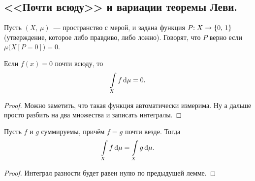 \documentclass{notes}
\begin{document}
\subsection{<<Почти всюду>> и вариации теоремы Леви.}
	
	\begin{de}
		Пусть $(X, \, \mu)$~--- пространство с мерой, и задана функция $P\text{\text{:}} \; X \to \{0, \, 1\}$ (утверждение, которое либо правдиво, либо ложно). Говорят, что $P$ верно  если $\mu\big(X[P = 0]\big) = 0$. 
	\end{de}

	\begin{lm}
		Если $f(x) = 0$ почти всюду, то
		\[
			\int\limits_X f \, \mathrm{d} \mu = 0.
		\]
		\begin{proof}
			Можно заметить, что такая функция автоматически измерима. Ну а дальше просто разбить на два множества и записать интегралы.
		\end{proof}
	\end{lm}

	\begin{lm}
		Пусть $f$ и $g$ суммируемы, причём $f = g$ почти везде. Тогда
		\[
			\int\limits_{X} f \, \mathrm{d} \mu = \int\limits_{X} g \, \mathrm{d} \mu.
		\]
		\begin{proof}
			Интеграл разности будет равен нулю по предыдущей лемме.
		\end{proof}
	\end{lm}
\end{document}
